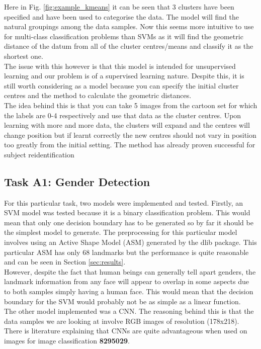 \documentclass{article}
\begin{document}
	Here in Fig. \ref{fig:example_kmeans} it can be seen that 3 clusters have been specified and have been used to categorise the data. The model will find the natural groupings among the data samples. Now this seems more intuitive to use for multi-class classification problems than SVMs as it will find the geometric distance of the datum from all of the cluster centres/means and classify it as the shortest one.\\
	
	 The issue with this however is that this model is intended for unsupervised learning and our problem is of a supervised learning nature. Despite this, it is still worth considering as a model because you can specify the initial cluster centres and the method to calculate the geometric distances.\\
	 
	  The idea behind this is that you can take 5 images from the cartoon set for which the labels are 0-4 respectively and use that data as the cluster centres. Upon learning with more and more data, the clusters will expand and the centres will change position but if learnt correctly the new centres should not vary in position too greatly from the initial setting. The method has already proven successful for subject reidentification \cite{8227986}
	  
    \subsection{Task A1: Gender Detection}
    For this particular task, two models were implemented and tested. Firstly, an SVM model was tested because it is a binary classification problem. This would mean that only one decision boundary has to be generated so by far it should be the simplest model to generate. The preprocessing for this particular model involves using an Active Shape Model (ASM) generated by the dlib package. This particular ASM has only 68 landmarks but the performance is quite reasonable and can be seen in Section \ref{sec:results}. \\
    
    However, despite the fact that human beings can generally tell apart genders, the landmark information from any face will appear to overlap in some aspects due to both samples simply having a human face. This would mean that the decision boundary for the SVM would probably not be as simple as a linear function. \\
    
    The other model implemented was a CNN. The reasoning behind this is that the data samples we are looking at involve RGB images of resolution (178x218). There is literature \cite{08942386} explaining that CNNs are quite advantageous when used on images for image classification \textbf{8295029}. 
\end{document}
